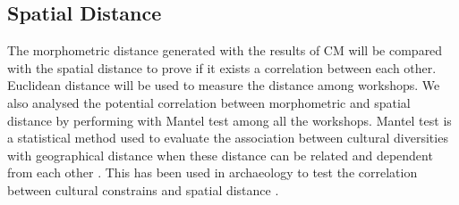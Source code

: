 \documentclass[review]{elsarticle}
\newcommand{\memo}[2]{\textcolor{#1}{#2}}
\newcommand{\xavi}[1]{\memo{orange}{xavi: #1\\}}
\begin{document}


\subsection{Spatial Distance}

The morphometric distance generated with the results of CM will be compared with the spatial distance to prove if it exists a correlation between each other. Euclidean distance will be used to measure the distance among workshops. We also analysed the potential correlation between morphometric and spatial distance by performing with Mantel test among all the workshops. Mantel test is a statistical method used to evaluate the association between cultural diversities with geographical distance when these distance can be related and dependent from each other \citep{mantel_detection_1967, diniz-filho_mantel_2013}. This has been used in archaeology to test the correlation between cultural constrains and spatial distance \citep{crema_culture_2014}.  
\end{document}
